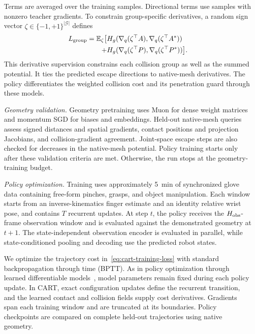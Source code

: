 Terms are averaged over the training samples. Directional terms use samples with nonzero teacher gradients. To constrain group-specific derivatives, a random sign vector $\zeta\in\{-1,+1\}^{|\mathcal G|}$ defines
\begin{equation}
\begin{aligned}
    L_{\rm group}=\mathbb E_\zeta\bigl[&H_g(\nabla_q(\zeta^\top A),
                                      \nabla_q(\zeta^\top A^*))\\
                                    +&H_g(\nabla_q(\zeta^\top P),
                                      \nabla_q(\zeta^\top P^*))\bigr].
\end{aligned}
    \label{eq:cart-group-sobolev}
\end{equation}
This derivative supervision constrains each collision group as well as the summed potential. It ties the predicted escape directions to native-mesh derivatives. The policy differentiates the weighted collision cost and its penetration guard through these models.

\textit{Geometry validation.} Geometry pretraining uses Muon for dense weight matrices and momentum SGD for biases and embeddings. Held-out native-mesh queries assess signed distances and spatial gradients, contact positions and projection Jacobians, and collision-gradient agreement. Joint-space escape steps are also checked for decreases in the native-mesh potential. Policy training starts only after these validation criteria are met. Otherwise, the run stops at the geometry-training budget.

\textit{Policy optimization.} Training uses approximately 5~min of synchronized glove data containing free-form pinches, grasps, and object manipulation. Each window starts from an inverse-kinematics finger estimate and an identity relative wrist pose, and contains $T$ recurrent updates. At step $t$, the policy receives the $H_{\rm obs}$-frame observation window and is evaluated against the demonstrated geometry at $t+1$. The state-independent observation encoder is evaluated in parallel, while state-conditioned pooling and decoding use the predicted robot states.

We optimize the trajectory cost in~\eqref{eq:cart-training-loss} with standard backpropagation through time (BPTT). As in policy optimization through learned differentiable models~\cite{liao2026supermimic}, model parameters remain fixed during each policy update. In CART, exact configuration updates define the recurrent transition, and the learned contact and collision fields supply cost derivatives. Gradients span each training window and are truncated at its boundaries. Policy checkpoints are compared on complete held-out trajectories using native geometry.

